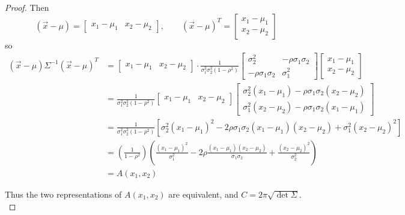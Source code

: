 \documentclass{article}
\begin{document}
\begin{enumerate}
\begin{enumerate}
\begin{proof}
					Then \[(\vec{x}-\mu)=\begin{bmatrix}
							x_1-\mu_1 & x_2-\mu_2
						\end{bmatrix}, \quad\quad (\vec{x}-\mu)^{T} = \begin{bmatrix}
							x_1-\mu_1 \\ x_2 - \mu_2
					\end{bmatrix}\] so 
					\begin{align*}
						(\vec{x}-\mu)\Sigma^{-1}(\vec{x}-\mu)^T &= \begin{bmatrix}
							x_1-\mu_1 & x_2-\mu_2
						\end{bmatrix} \cdot \frac{1}{\sigma_1^2\sigma_2^2(1-\rho^2)}\begin{bmatrix}
							\sigma_2^2 & -\rho\sigma_1\sigma_2 \\
							-\rho\sigma_1\sigma_2 & \sigma_1^2
						\end{bmatrix}
\begin{bmatrix}
							x_1-\mu_1 \\ x_2 - \mu_2
					\end{bmatrix} \\
					&= \frac{1}{\sigma_1^2\sigma_2^2(1-\rho^2)}\begin{bmatrix}
						x_1-\mu_1 & x_2-\mu_2
					\end{bmatrix} \begin{bmatrix}
						\sigma_2^2(x_1-\mu_1)-\rho\sigma_1\sigma_2(x_2-\mu_2) \\
						\sigma_1^2(x_2-\mu_2)-\rho\sigma_1\sigma_2(x_1-\mu_1)
					\end{bmatrix} \\
					&= \frac{1}{\sigma_1^2\sigma_2^2(1-\rho^2)}\left[ \sigma_2^2(x_1-\mu_1)^2-2\rho\sigma_1\sigma_2(x_1-\mu_1)(x_2-\mu_2)+\sigma_1^2(x_2-\mu_2)^2 \right] \\
					&= \left( \frac{1}{1-\rho^2} \right)\left( \frac{(x_1-\mu_1)^2}{\sigma_1^2} -2\rho\frac{(x_1-\mu_1)(x_2-\mu_2)}{\sigma_1\sigma_2} + \frac{(x_2-\mu_2)^2}{\sigma_2^2} \right) \\
					&= A(x_1, x_2)
					\end{align*}

					Thus the two representations of $A(x_1, x_2)$ are equivalent, and $\boxed{C=2\pi\sqrt{\det{\Sigma}}.}$ 

				\end{proof}


\end{enumerate}
\end{enumerate}
\end{document}
